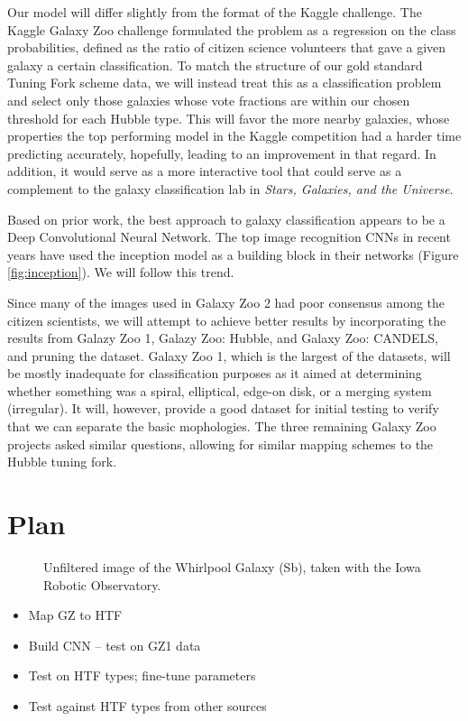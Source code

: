 \documentclass[twocolumn]{aastex6}
\begin{document}
Our model will differ slightly from the format of the Kaggle challenge. The Kaggle Galaxy Zoo challenge formulated the problem as a regression on the class probabilities, defined as the ratio of citizen science volunteers that gave a given galaxy a certain classification. To match the structure of our gold standard Tuning Fork scheme data, we will instead treat this as a classification problem and select only those galaxies whose vote fractions are within our chosen threshold for each Hubble type. This will favor the more nearby galaxies, whose properties the top performing model in the Kaggle competition had a harder time predicting accurately, hopefully, leading to an improvement in that regard. In addition, it would serve as a more interactive tool that could serve as a complement to the galaxy classification lab in \emph{Stars, Galaxies, and the Universe}.

Based on prior work, the best approach to galaxy classification appears to be a Deep Convolutional Neural Network. The top image recognition CNNs in recent years have used the inception model \citep{2014arXiv1409.4842S} as a building block in their networks (Figure \ref{fig:inception}). We will follow this trend.


Since many of the images used in Galaxy Zoo 2 had poor consensus among the citizen scientists, we will attempt to achieve better results by incorporating the results from Galazy Zoo 1, Galazy Zoo: Hubble, and Galaxy Zoo: CANDELS, and pruning the dataset. Galaxy Zoo 1, which is the largest of the datasets, will be mostly inadequate for classification purposes as it aimed at determining whether something was a spiral, elliptical, edge-on disk, or a merging system (irregular). It will, however, provide a good dataset for initial testing to verify that we can separate the basic mophologies. The three remaining Galaxy Zoo projects asked similar questions, allowing for similar mapping schemes to the Hubble tuning fork.


\section{Plan}


\begin{figure}
\caption{Unfiltered image of the Whirlpool Galaxy (Sb), taken with the Iowa Robotic Observatory.}
\end{figure}

\begin{itemize}
\item	Map GZ to HTF
\item	Build CNN -- test on GZ1 data
\item	Test on HTF types; fine-tune parameters
\item	Test against HTF types from other sources
\end{itemize}
\end{document}
